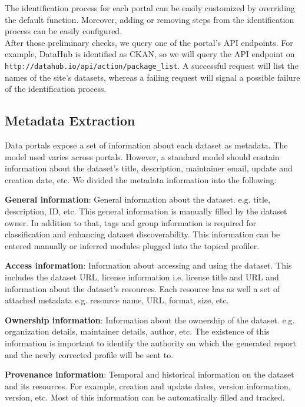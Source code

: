 \documentclass{sig-alternate}
\begin{document}
The identification process for each portal can be easily customized by overriding the default function. Moreover, adding or removing steps from the identification process can be easily configured.\\
After those preliminary checks, we query one of the portal's API endpoints. For example, DataHub is identified as CKAN, so we will query the API endpoint on \texttt{http://datahub.\-io/api/action/package\_list}. A successful request will list the names of the site's datasets, whereas a failing request will signal a possible failure of the identification process.

\subsection{Metadata Extraction}

Data portals expose a set of information about each dataset as metadata. The model used varies across portals. However, a standard model should contain information about the dataset's title, description, maintainer email, update and creation date, etc. We divided the metadata information into the following:

\textbf{General information}: General information about the dataset. e.g. title, description, ID, etc. This general information is manually filled by the dataset owner. In addition to that, tags and group information is required for classification and enhancing dataset discoverability. This information can be entered manually or inferred modules plugged into the topical profiler.

\textbf{Access information}: Information about accessing and using the dataset. This includes the dataset URL, license information i.e. license title and URL and information about the dataset's resources. Each resource has as well a set of attached metadata e.g. resource name, URL, format, size, etc.

\textbf{Ownership information}: Information about the ownership of the dataset. e.g. organization details, maintainer details, author, etc. The existence of this information is important to identify the authority on which the generated report and the newly corrected profile will be sent to.

\textbf{Provenance information}: Temporal and historical information on the dataset and its resources. For example, creation and update dates, version information, version, etc. Most of this information can be automatically filled and tracked.
\end{document}
